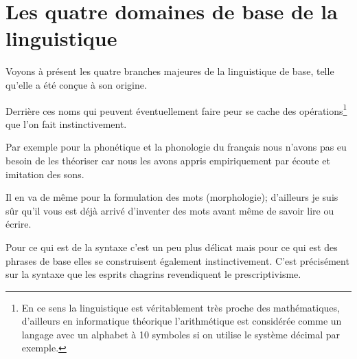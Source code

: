 \newpage

\section{Les quatre domaines de base de la linguistique}

Voyons à présent les quatre branches majeures de la linguistique de
base, telle qu'elle a été conçue à son origine.

\begin{center}
\begin{mdframed}[style=citestyle, frametitle={Extrait du livre \bs}]
\end{mdframed}  
\end{center}

Derrière ces noms qui peuvent éventuellement faire peur se cache des
opérations\footnote{En ce sens la linguistique est véritablement très
  proche des mathématiques, d'ailleurs en informatique théorique
  l'arithmétique est considérée comme un langage avec un alphabet à 10
symboles si on utilise le système décimal par exemple.} que l'on fait
instinctivement.

Par exemple pour la phonétique et la phonologie du français nous
n'avons pas eu besoin de les théoriser car nous les avons appris
empiriquement par écoute et imitation des sons.

Il en va de même pour la formulation des mots (morphologie); d'ailleurs je suis sûr
qu'il vous est déjà arrivé d'inventer des mots avant même de savoir
lire ou écrire.

Pour ce qui est de la syntaxe c'est un peu plus délicat mais pour ce
qui est des phrases de base elles se construisent également
instinctivement. C'est précisément sur la syntaxe que les esprits
chagrins revendiquent le prescriptivisme.


